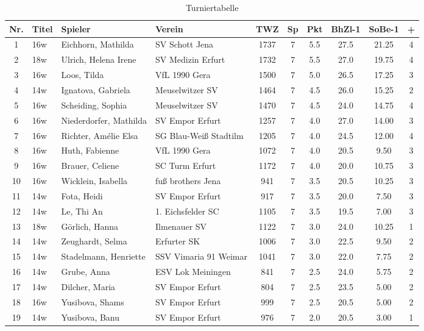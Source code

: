 \begin{table}[H]
\centering
\begin{tabular}{|c|l|l|l|c|c|c|c|c|c|}
\hline
Nr. & Titel & Spieler & Verein & TWZ & Sp & Pkt & BhZl-1 & SoBe-1 & + \\ \hline
1 & 16w & Eichhorn, Mathilda & SV Schott Jena & 1737 & 7 & 5.5 & 27.5 & 21.25 & 4 \\
2 & 18w & Ulrich, Helena Irene & SV Medizin Erfurt & 1732 & 7 & 5.5 & 27.0 & 19.75 & 4 \\
3 & 16w & Loos, Tilda & VfL 1990 Gera & 1500 & 7 & 5.0 & 26.5 & 17.25 & 3 \\
4 & 14w & Ignatova, Gabriela & Meuselwitzer SV & 1464 & 7 & 4.5 & 26.0 & 15.25 & 2 \\
5 & 16w & Scheiding, Sophia & Meuselwitzer SV & 1470 & 7 & 4.5 & 24.0 & 14.75 & 4 \\
6 & 16w & Niederdorfer, Mathilda & SV Empor Erfurt & 1257 & 7 & 4.0 & 27.0 & 14.00 & 3 \\
7 & 16w & Richter, Amélie Elsa & SG Blau-Weiß Stadtilm & 1205 & 7 & 4.0 & 24.5 & 12.00 & 4 \\
8 & 16w & Huth, Fabienne & VfL 1990 Gera & 1072 & 7 & 4.0 & 20.5 & 9.50 & 3 \\
9 & 16w & Brauer, Celiene & SC Turm Erfurt & 1172 & 7 & 4.0 & 20.0 & 10.75 & 3 \\
10 & 16w & Wicklein, Isabella & fuß brothers Jena & 941 & 7 & 3.5 & 20.5 & 10.25 & 3 \\
11 & 14w & Fota, Heidi & SV Empor Erfurt & 917 & 7 & 3.5 & 20.0 & 7.50 & 3 \\
12 & 14w & Le, Thi An & 1. Eichsfelder SC & 1105 & 7 & 3.5 & 19.5 & 7.00 & 3 \\
13 & 18w & Görlich, Hanna & Ilmenauer SV & 1122 & 7 & 3.0 & 24.0 & 10.25 & 1 \\
14 & 14w & Zeughardt, Selma & Erfurter SK & 1006 & 7 & 3.0 & 22.5 & 9.50 & 2 \\
15 & 14w & Stadelmann, Henriette & SSV Vimaria 91 Weimar & 1041 & 7 & 3.0 & 22.0 & 7.75 & 2 \\
16 & 14w & Grube, Anna & ESV Lok Meiningen & 841 & 7 & 2.5 & 24.0 & 5.75 & 2 \\
17 & 14w & Dilcher, Maria & SV Empor Erfurt & 804 & 7 & 2.5 & 23.5 & 5.00 & 2 \\
18 & 16w & Yusibova, Shams & SV Empor Erfurt & 999 & 7 & 2.5 & 20.5 & 5.00 & 2 \\
19 & 14w & Yusibova, Banu & SV Empor Erfurt & 976 & 7 & 2.0 & 20.5 & 3.00 & 1 \\ \hline
\end{tabular}
\caption{Turniertabelle}
\label{tab:turniertabelle}
\end{table}